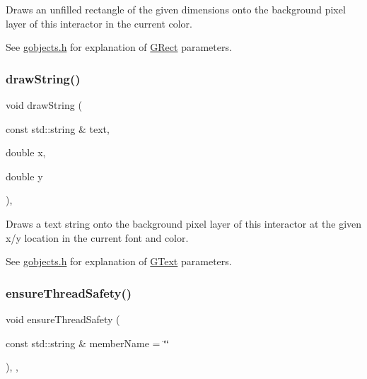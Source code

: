 Draws an unfilled rectangle of the given dimensions onto the background pixel layer of this interactor in the current color. 

See \mbox{\hyperlink{gobjects_8h_source}{gobjects.\+h}} for explanation of \mbox{\hyperlink{classGRect}{G\+Rect}} parameters. \mbox{\label{classGDrawingSurface_ad4e8551a753a77135792bbee97013675}} 
\subsubsection{\texorpdfstring{draw\+String()}{drawString()}}
{\footnotesize\ttfamily void draw\+String (\begin{DoxyParamCaption}\item[{const std\+::string \&}]{text,  }\item[{double}]{x,  }\item[{double}]{y }\end{DoxyParamCaption})\hspace{0.3cm}{\ttfamily [virtual]}, {\ttfamily [inherited]}}



Draws a text string onto the background pixel layer of this interactor at the given x/y location in the current font and color. 

See \mbox{\hyperlink{gobjects_8h_source}{gobjects.\+h}} for explanation of \mbox{\hyperlink{classGText}{G\+Text}} parameters. \mbox{\label{classGObservable_a284f31528c0520f8e545c03ac9eeac74}} 
\subsubsection{\texorpdfstring{ensure\+Thread\+Safety()}{ensureThreadSafety()}}
{\footnotesize\ttfamily void ensure\+Thread\+Safety (\begin{DoxyParamCaption}\item[{const std\+::string \&}]{member\+Name = {\ttfamily \char`\"{}\char`\"{}} }\end{DoxyParamCaption})\hspace{0.3cm}{\ttfamily [protected]}, {\ttfamily [virtual]}, {\ttfamily [inherited]}}




